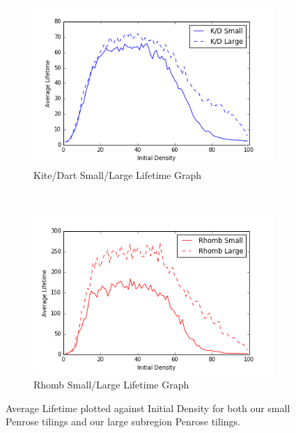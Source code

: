 \documentclass[a4paper,11pt]{report}
\begin{document}
\begin{figure}[htp]
\centering
	\begin{subfigure}[t]{0.6\textwidth}
	\includegraphics[width=\textwidth]{ch4_figs/ckd_small_large_lifetime}
	\caption{Kite/Dart Small/Large Lifetime Graph}
	\label{fig:ckd_small_large_lifetime}
	\end{subfigure}
~
	\begin{subfigure}[t]{0.6\textwidth}
	\centering
	\includegraphics[width=\textwidth]{ch4_figs/crh_small_large_lifetime}
	\caption{Rhomb Small/Large Lifetime Graph}
	\label{fig:crh_small_large_lifetime}
	\end{subfigure}
\caption[Small/Large Lifetime Graphs]{
	Average Lifetime plotted against Initial Density for both our small Penrose tilings and our large subregion Penrose tilings.
	}
\end{figure}
\end{document}
